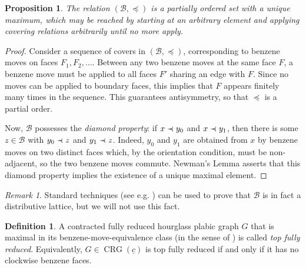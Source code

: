 \documentclass{amsart}
\newtheorem{proposition}[theorem]{Proposition}
\theoremstyle{definition}
\newtheorem{definition}[theorem]{Definition}
\theoremstyle{remark}
\newtheorem{remark}[theorem]{Remark}
\numberwithin{equation}{section}
\DeclareMathOperator{\crg}{CRG}
\newcommand\precdot{\mathrel{\ooalign{$\prec$\cr
  \hidewidth\raise0.001ex\hbox{$\cdot\mkern0.6mu$}\cr}}}
\begin{document}
\begin{proposition}
\label{prop:benzene-max-exists}
  The relation $(\mathcal{B}, \preceq)$ is a partially ordered set with a unique maximum, which may be reached by starting at an arbitrary element and applying covering relations arbitrarily until no more apply.
\end{proposition}
\begin{proof}
Consider a sequence of covers in $(\mathcal{B},\preceq)$, corresponding to benzene moves on faces $F_1,F_2,\ldots$. Between any two benzene moves at the same face $F$, a benzene move must be applied to all faces $F'$ sharing an edge with $F$. Since no moves can be applied to boundary faces, this implies that $F$ appears finitely many times in the sequence.  This guarantees antisymmetry, so that $\preceq$ is a partial order. 

  Now, $\mathcal{B}$ possesses the \emph{diamond property}: if $x \precdot y_0$ and $x \precdot y_1$, then there is some $z \in \mathcal{B}$ with $y_0 \precdot z$ and $y_1 \precdot z$. Indeed, $y_0$ and $y_1$ are obtained from $x$ by benzene moves on two distinct faces which, by the orientation condition, must be non-adjacent, so the two benzene moves commute. Newman's Lemma \cite[Thm.~1]{Newman} asserts that this diamond property implies the existence of a unique maximal element.
\end{proof}

\begin{remark}
Standard techniques (see e.g. \cite[\S 3.1]{Kenyon}) can be used to prove that $\mathcal{B}$ is in fact a distributive lattice, but we will not use this fact.
\end{remark}

\begin{definition}
\label{def:top-fully-reduced}
A contracted fully reduced hourglass plabic graph $G$ that is maximal in its benzene-move-equivalence class (in the sense of ) is called \emph{top fully reduced}. Equivalently, $G \in \crg(\underline{c})$ is top fully reduced if and only if it has no clockwise benzene faces.
\end{definition}
\end{document}
